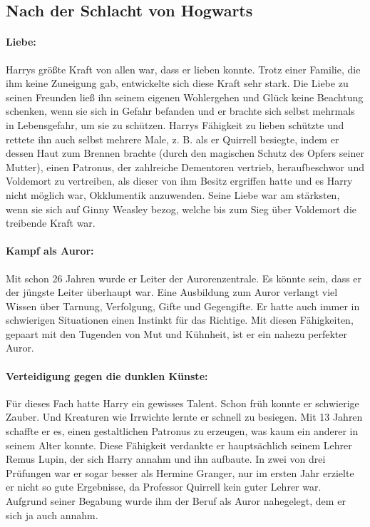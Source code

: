 \documentclass[a4paper, 10pt]{article}
\begin{document}
\subsection*{\Large Nach der Schlacht von Hogwarts}
\vspace{10pt}
\newline
{}  
\paragraph{Liebe:} 

Harrys größte Kraft von allen war, dass er lieben konnte. Trotz einer Familie, die ihm keine Zuneigung gab, entwickelte sich diese Kraft sehr stark. Die Liebe zu seinen Freunden ließ ihn seinem eigenen Wohlergehen und Glück keine Beachtung schenken, wenn sie sich in Gefahr befanden und er brachte sich selbst mehrmals in Lebensgefahr, um sie zu schützen. Harrys Fähigkeit zu lieben schützte und rettete ihn auch selbst mehrere Male, z. B. als er Quirrell besiegte, indem er dessen Haut zum Brennen brachte (durch den magischen Schutz des Opfers seiner Mutter), einen Patronus, der zahlreiche Dementoren vertrieb, heraufbeschwor und Voldemort zu vertreiben, als dieser von ihm Besitz ergriffen hatte und es Harry nicht möglich war, Okklumentik anzuwenden. Seine Liebe war am stärksten, wenn sie sich auf Ginny Weasley bezog, welche bis zum Sieg über Voldemort die treibende Kraft war.

\paragraph{Kampf als Auror:}
Mit schon 26 Jahren wurde er Leiter der Aurorenzentrale. Es könnte sein, dass er der jüngste Leiter überhaupt war. Eine Ausbildung zum Auror verlangt viel Wissen über Tarnung, Verfolgung, Gifte und Gegengifte. Er hatte auch immer in schwierigen Situationen einen Instinkt für das Richtige. Mit diesen Fähigkeiten, gepaart mit den Tugenden von Mut und Kühnheit, ist er ein nahezu perfekter Auror.

\paragraph{Verteidigung gegen die dunklen Künste:}
Für dieses Fach hatte Harry ein gewisses Talent. Schon früh konnte er schwierige Zauber. Und Kreaturen wie Irrwichte lernte er schnell zu besiegen. Mit 13 Jahren schaffte er es, einen gestaltlichen Patronus zu erzeugen, was kaum ein anderer in seinem Alter konnte. Diese Fähigkeit verdankte er hauptsächlich seinem Lehrer Remus Lupin, der sich Harry annahm und ihn aufbaute. In zwei von drei Prüfungen war er sogar besser als Hermine Granger, nur im ersten Jahr erzielte er nicht so gute Ergebnisse, da Professor Quirrell kein guter Lehrer war. Aufgrund seiner Begabung wurde ihm der Beruf als Auror nahegelegt, dem er sich ja auch annahm.
\end{document}
